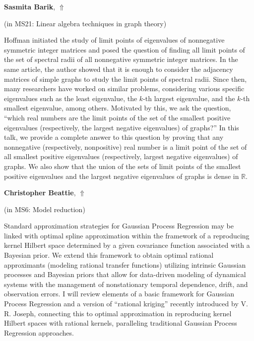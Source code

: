\documentclass[ILAS2025-program.tex]{subfiles}
\begin{document}
\hypertarget{down0336}{}\begin{ilasabstract}
    
\textbf{Sasmita Barik},  \hfill \hyperlink{up0336}{$\Uparrow$}
    
    
(in {\color{mstitle}MS21: Linear algebra techniques in graph theory})
        
\mtskip
    Hoffman initiated the study of limit points of eigenvalues of nonnegative symmetric integer matrices and posed the question of finding all limit points of the set of spectral radii of all nonnegative symmetric integer matrices. In the same article, the author showed that it is enough to consider the adjacency matrices of simple graphs to study the limit points of spectral radii. Since then, many researchers have worked on similar problems, considering various specific eigenvalues such as the least eigenvalue, the $k$-th largest eigenvalue, and the $k$-th smallest eigenvalue, among others. Motivated by this, we ask the question, ``which real numbers are the limit points of the set of the smallest positive eigenvalues (respectively, the largest negative eigenvalues) of graphs?'' In this talk, we provide a complete answer to this question by proving that any nonnegative (respectively, nonpositive) real number is a limit point of the set of all smallest positive eigenvalues (respectively, largest negative eigenvalues) of graphs. We also show that the union of the sets of limit points of the smallest positive eigenvalues and the largest negative eigenvalues of graphs is dense in $\mathbb{R}$.

\end{ilasabstract}
    

\hypertarget{down0209}{}\begin{ilasabstract}
    
\textbf{Christopher Beattie},  \hfill \hyperlink{up0209}{$\Uparrow$}
    
    
(in {\color{mstitle}MS6: Model reduction})
        
\mtskip
    Standard approximation strategies for Gaussian Process Regression may be linked with optimal spline approximation within the framework of a reproducing kernel Hilbert space determined by a given covariance function associated with a Bayesian prior.   We extend this framework to obtain optimal rational approximants (modeling rational transfer functions) utilizing intrinsic Gaussian processes and Bayesian priors that allow for data-driven modeling of dynamical systems with the management of nonstationary temporal dependence, drift, and observation errors.  I will review elements of a basic framework for Gaussian Process Regression and a version of ``rational kriging'' recently introduced by V. R. Joseph,  connecting this to optimal approximation in reproducing kernel Hilbert spaces with rational kernels, paralleling traditional Gaussian Process Regression approaches.

\end{ilasabstract}
    
\end{document}
